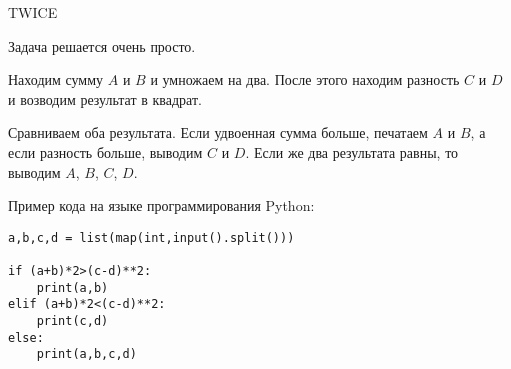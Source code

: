 \begin{tutorial}{TWICE}

Задача решается очень просто. 

Находим сумму $A$ и $B$ и умножаем на два. После этого находим разность $C$ и $D$ и возводим результат в квадрат.

Сравниваем оба результата. Если удвоенная сумма больше, печатаем $A$ и $B$, а если разность больше, выводим $C$ и $D$. Если же два результата равны, то выводим $A$, $B$, $C$, $D$.

Пример кода на языке программирования Python:
\begin{verbatim}
a,b,c,d = list(map(int,input().split()))

if (a+b)*2>(c-d)**2:
    print(a,b)
elif (a+b)*2<(c-d)**2:
    print(c,d)
else:
    print(a,b,c,d)
\end{verbatim}

\end{tutorial}
